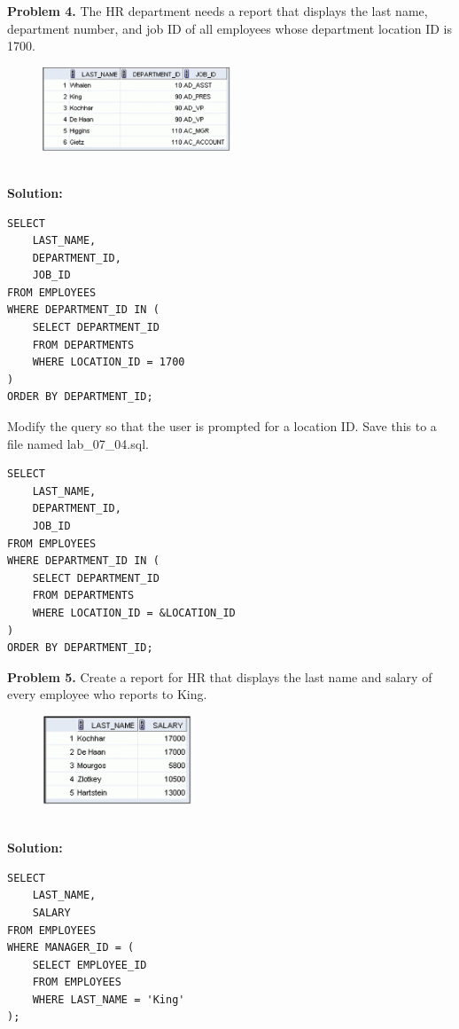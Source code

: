 \documentclass[12pt,a4paper]{article}
\begin{document}
\vspace{0.5cm}
\newpage
\textbf{Problem 4.} The HR department needs a report that displays the last name, department number, and job ID of all employees whose department location ID is 1700.
\begin{figure}[htbp]
  \centering
  \includegraphics[width=0.5\textwidth]{Screenshots/74.png}
\end{figure}\\
\textbf{Solution:}
\begin{lstlisting}[style=sqlstyle]
SELECT 
    LAST_NAME,
    DEPARTMENT_ID,
    JOB_ID
FROM EMPLOYEES
WHERE DEPARTMENT_ID IN (
    SELECT DEPARTMENT_ID
    FROM DEPARTMENTS
    WHERE LOCATION_ID = 1700
)
ORDER BY DEPARTMENT_ID;
\end{lstlisting}

Modify the query so that the user is prompted for a location ID. Save this to a file named lab\_07\_04.sql.

\begin{lstlisting}[style=sqlstyle]
SELECT 
    LAST_NAME,
    DEPARTMENT_ID,
    JOB_ID
FROM EMPLOYEES
WHERE DEPARTMENT_ID IN (
    SELECT DEPARTMENT_ID
    FROM DEPARTMENTS
    WHERE LOCATION_ID = &LOCATION_ID
)
ORDER BY DEPARTMENT_ID;
\end{lstlisting}

\vspace{0.5cm}

\textbf{Problem 5.} Create a report for HR that displays the last name and salary of every employee who reports to King.
\begin{figure}[htbp]
  \centering
  \includegraphics[width=0.4\textwidth]{Screenshots/75.png}
\end{figure}\\
\textbf{Solution:}
\begin{lstlisting}[style=sqlstyle]
SELECT 
    LAST_NAME,
    SALARY
FROM EMPLOYEES
WHERE MANAGER_ID = (
    SELECT EMPLOYEE_ID
    FROM EMPLOYEES
    WHERE LAST_NAME = 'King'
);
\end{lstlisting}
\end{document}
